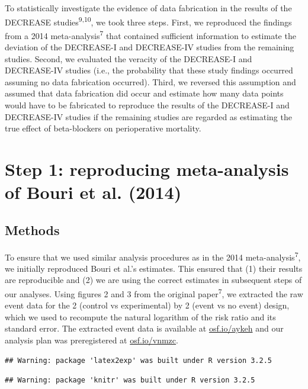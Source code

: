 \documentclass[]{article}
\begin{document}
To statistically investigate the evidence of data fabrication in the
results of the DECREASE studies\textsuperscript{9,10}, we took three
steps. First, we reproduced the findings from a 2014
meta-analysis\textsuperscript{7} that contained sufficient information
to estimate the deviation of the DECREASE-I and DECREASE-IV studies from
the remaining studies. Second, we evaluated the veracity of the
DECREASE-I and DECREASE-IV studies (i.e., the probability that these
study findings occurred assuming no data fabrication occurred). Third,
we reversed this assumption and assumed that data fabrication did occur
and estimate how many data points would have to be fabricated to
reproduce the results of the DECREASE-I and DECREASE-IV studies if the
remaining studies are regarded as estimating the true effect of
beta-blockers on perioperative mortality.

\section{Step 1: reproducing meta-analysis of Bouri et al.
(2014)}\label{step-1-reproducing-meta-analysis-of-bouri-et-al.-2014}

\subsection{Methods}\label{methods}

To ensure that we used similar analysis procedures as in the 2014
meta-analysis\textsuperscript{7}, we initially reproduced Bouri et al.'s
estimates. This ensured that (1) their results are reproducible and (2)
we are using the correct estimates in subsequent steps of our analyses.
Using figures 2 and 3 from the original paper\textsuperscript{7}, we
extracted the raw event data for the 2 (control vs experimental) by 2
(event vs no event) design, which we used to recompute the natural
logarithm of the risk ratio and its standard error. The extracted event
data is available at \href{https://osf.io/aykeh}{osf.io/aykeh} and our
analysis plan was preregistered at
\href{https://osf.io/vnmzc}{osf.io/vnmzc}.

\begin{verbatim}
## Warning: package 'latex2exp' was built under R version 3.2.5
\end{verbatim}

\begin{verbatim}
## Warning: package 'knitr' was built under R version 3.2.5
\end{verbatim}
\end{document}
